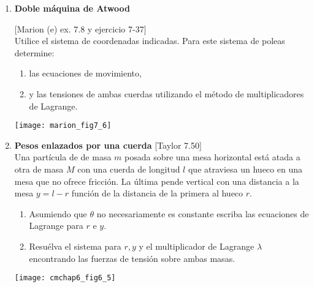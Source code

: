 \documentclass[11pt, spanish, a4paper, twoside]{article}
\begin{document}
\begin{enumerate}
	
\item
\begin{minipage}[t][8.5cm]{0.55\textwidth}
\textbf{Doble máquina de Atwood}

[Marion (e) ex. 7.8 y ejercicio 7-37]\\
Utilice el sistema de coordenadas indicadas.
Para este sistema de poleas determine: 
\begin{enumerate}
	\item las ecuaciones de movimiento,
	\item y las tensiones de ambas cuerdas utilizando el método de multiplicadores de Lagrange.
\end{enumerate}
\end{minipage}
\begin{minipage}[c][0.5cm][t]{0.4\textwidth}
	\texttt{[image: marion\_fig7\_6]}
\end{minipage}



\item
\begin{minipage}[t][5cm]{0.65\textwidth}
\textbf{Pesos enlazados por una cuerda} [Taylor 7.50]\\
Una partícula de de masa \(m\) posada sobre una mesa horizontal está atada a otra de masa \(M\) con una cuerda de longitud \(l\) que atraviesa un hueco en una mesa que no ofrece fricción.
La última pende vertical con una distancia a la mesa \(y = l - r\) función de la distancia de la primera al hueco \(r\).
\begin{enumerate}
\item Asumiendo que \(\theta\) no necesariamente es constante escriba las ecuaciones de Lagrange para \(r\) e  \(y\).
\item Resuélva el sistema para \(r, y\) y el multiplicador de Lagrange \(\lambda\) encontrando las fuerzas de tensión sobre ambas masas.
\end{enumerate}
\end{minipage}
\begin{minipage}[c][0cm][t]{0.3\textwidth}
	\texttt{[image: cmchap6\_fig6\_5]}
\end{minipage}






\end{enumerate}
\end{document}
